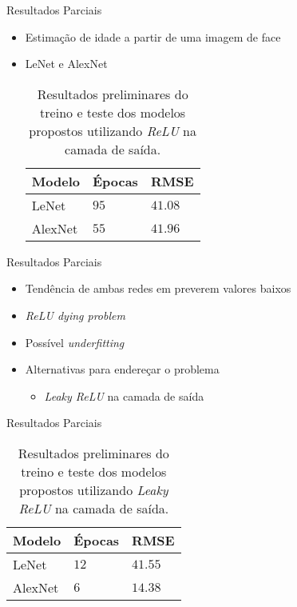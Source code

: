 \begin{frame}{Resultados Parciais}
 \begin{itemize}
   \item Estimação de idade a partir de uma imagem de face
   \item LeNet e AlexNet
   \begin{table}[h!]
        \caption{Resultados preliminares do treino e teste dos modelos propostos utilizando \emph{ReLU} na camada de saída.}
        \label{tab:results_relu}
        \centering
        \begin{tabular}{l l l}
             \toprule
             Modelo & Épocas &RMSE \\
             \midrule
             LeNet & $95$ & $41.08$ \\
             AlexNet & $55$ & $41.96$\\
             \bottomrule
        \end{tabular}
   \end{table}
   \end{itemize}
\end{frame}

\begin{frame}{Resultados Parciais}
 \begin{itemize}
   \item Tendência de ambas redes em preverem valores baixos
   \item \emph{ReLU dying problem}
   \item Possível \emph{underfitting}
   \item Alternativas para endereçar o problema
   \begin{itemize}
        \item \emph{Leaky ReLU} na camada de saída
   \end{itemize}
   \end{itemize}
\end{frame}

\begin{frame}{Resultados Parciais}
   \begin{table}[h!]
        \caption{Resultados preliminares do treino e teste dos modelos propostos utilizando \emph{Leaky ReLU} na camada de saída.}
        \label{tab:results_leaky}
        \centering
        \begin{tabular}{l l l}
             \toprule
             Modelo & Épocas & RMSE \\
             \midrule
             LeNet & $12$ & $41.55$ \\
             AlexNet & $6$ & $14.38$\\
             \bottomrule
        \end{tabular}
   \end{table}
\end{frame}
